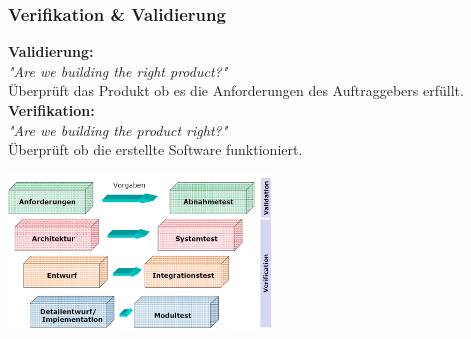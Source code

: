 \begin{minipage}{10cm}
	\subsubsection{Verifikation \& Validierung}
	\textbf{Validierung:}\\
	\textit{"{}Are we building the right product?"}\\
	Überprüft das Produkt ob es die Anforderungen des Auftraggebers erfüllt.\\
	\textbf{Verifikation:}\\
	\textit{"{}Are we building the product right?"}\\
	Überprüft ob die erstellte Software funktioniert.\\
\end{minipage}
\begin{minipage}{7cm}
	\includegraphics[width=7cm]{images/verificationvalidation}
\end{minipage}

